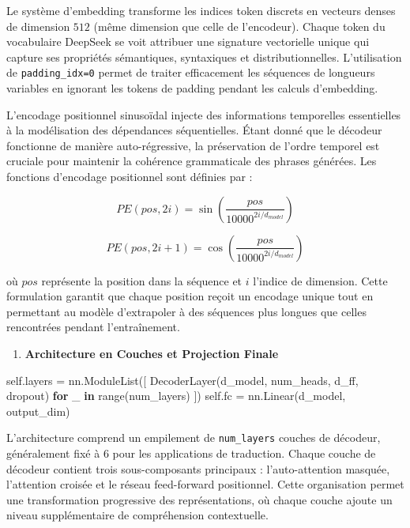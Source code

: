 \documentclass[12pt]{article}
\providecommand{\tightlist}{%
      \setlength{\itemsep}{0pt}\setlength{\parskip}{0pt}}
\newenvironment{Shaded}{}{}
\newcommand{\KeywordTok}[1]{\textcolor[rgb]{0.00,0.44,0.13}{\textbf{{#1}}}}
\newcommand{\NormalTok}[1]{{#1}}
\newcommand{\VariableTok}[1]{\textcolor[rgb]{0.10,0.09,0.49}{{#1}}}
\newcommand{\ControlFlowTok}[1]{\textcolor[rgb]{0.00,0.44,0.13}{\textbf{{#1}}}}
\newcommand{\OperatorTok}[1]{\textcolor[rgb]{0.40,0.40,0.40}{{#1}}}
\newcommand{\BuiltInTok}[1]{{#1}}
\begin{document}
Le système d'embedding transforme les indices token discrets en vecteurs
denses de dimension \(512\) (même dimension que celle de l'encodeur).
Chaque token du vocabulaire DeepSeek se voit attribuer une signature
vectorielle unique qui capture ses propriétés sémantiques, syntaxiques
et distributionnelles. L'utilisation de \texttt{padding\_idx=0} permet
de traiter efficacement les séquences de longueurs variables en ignorant
les tokens de padding pendant les calculs d'embedding.

L'encodage positionnel sinusoïdal injecte des informations temporelles
essentielles à la modélisation des dépendances séquentielles. Étant
donné que le décodeur fonctionne de manière auto-régressive, la
préservation de l'ordre temporel est cruciale pour maintenir la
cohérence grammaticale des phrases générées. Les fonctions d'encodage
positionnel sont définies par :

\[
PE(pos, 2i) = \sin\left(\frac{pos}{10000^{2i/d_{model}}}\right)
\]

\[
PE(pos, 2i+1) = \cos\left(\frac{pos}{10000^{2i/d_{model}}}\right)
\]

où \(pos\) représente la position dans la séquence et \(i\) l'indice de
dimension. Cette formulation garantit que chaque position reçoit un
encodage unique tout en permettant au modèle d'extrapoler à des
séquences plus longues que celles rencontrées pendant l'entraînement.

\begin{enumerate}
\def\labelenumi{\arabic{enumi}.}
\setcounter{enumi}{2}
\tightlist
\item
  \textbf{Architecture en Couches et Projection Finale}
\end{enumerate}

\begin{Shaded}
\begin{Highlighting}[]
\VariableTok{self}\NormalTok{.layers }\OperatorTok{=}\NormalTok{ nn.ModuleList([}
\NormalTok{    DecoderLayer(d\_model, num\_heads, d\_ff, dropout)}
    \ControlFlowTok{for}\NormalTok{ \_ }\KeywordTok{in} \BuiltInTok{range}\NormalTok{(num\_layers)}
\NormalTok{])}
\VariableTok{self}\NormalTok{.fc }\OperatorTok{=}\NormalTok{ nn.Linear(d\_model, output\_dim)}
\end{Highlighting}
\end{Shaded}

L'architecture comprend un empilement de \texttt{num\_layers} couches de
décodeur, généralement fixé à \(6\) pour les applications de traduction.
Chaque couche de décodeur contient trois sous-composants principaux :
l'auto-attention masquée, l'attention croisée et le réseau feed-forward
positionnel. Cette organisation permet une transformation progressive
des représentations, où chaque couche ajoute un niveau supplémentaire de
compréhension contextuelle.
\end{document}
